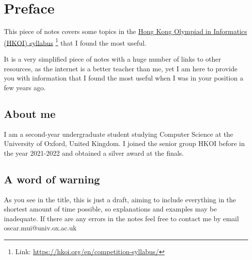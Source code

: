 \chapter*{Preface}

This piece of notes covers some topics in the \href{https://hkoi.org/en/competition-syllabus/}{Hong Kong Olympiad in Informatics (HKOI) syllabus} \footnote{Link: \href{https://hkoi.org/en/competition-syllabus/}{https://hkoi.org/en/competition-syllabus/}} that I found the most useful. 

It is a very simplified piece of notes with a huge number of links to other resources, as the internet is a better teacher than me, yet I am here to provide you with information that I found the most useful when I was in your position a few years ago.

\section*{About me}

I am a second-year undergraduate student studying Computer Science at the University of Oxford, United Kingdom. I joined the senior group HKOI before in the year 2021-2022 and obtained a silver award at the finals. 

\section*{A word of warning}

As you see in the title, this is just a draft, aiming to include everything in the shortest amount of time possible, so explanations and examples may be inadequate. If there are any errors in the notes feel free to contact me by email oscar.mui@univ.ox.ac.uk

